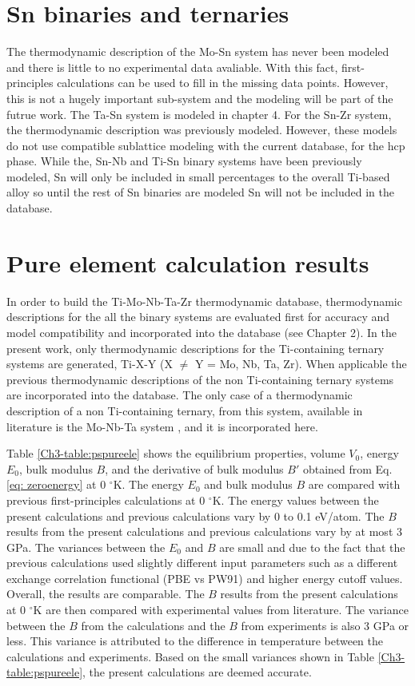 \section{Sn binaries and ternaries}

The thermodynamic description of the Mo-Sn system has never been modeled and there is little to no experimental data avaliable. With this fact, first-principles calculations can be used to fill in the missing data points. However, this is not a hugely important sub-system and the modeling will be part of the futrue work. The Ta-Sn system is modeled in chapter 4. For the Sn-Zr system, the thermodynamic description was previously modeled. However, these models do not use compatible sublattice modeling with the current database, for the hcp phase. While the, Sn-Nb and Ti-Sn binary systems have been previously modeled, Sn will only be included in small percentages to the overall Ti-based alloy so until the rest of Sn binaries are modeled Sn will not be included in the database.

\section{Pure element calculation results}

In order to build the Ti-Mo-Nb-Ta-Zr thermodynamic database, thermodynamic descriptions for the all the binary systems are evaluated first for accuracy and model compatibility and incorporated into the database (see Chapter 2). In the present work, only thermodynamic descriptions for the Ti-containing ternary systems are generated, Ti-X-Y (X $\neq$ Y = Mo, Nb, Ta, Zr). When applicable the previous thermodynamic descriptions of the non Ti-containing ternary systems are incorporated into the database. The only case of a thermodynamic description of a non Ti-containing ternary, from this system, available in literature is the Mo-Nb-Ta system \cite{Xiong2004}, and it is incorporated here.

Table \ref{Ch3-table:pspureele} shows the equilibrium properties, volume $V_{0}$, energy $E_{0}$, bulk modulus $B$, and the derivative of bulk modulus $B'$ obtained from Eq. \ref{eq: zeroenergy} at 0 $^{\circ}$K. The energy $E_{0}$ and bulk modulus $B$ are compared with previous first-principles calculations at 0 $^{\circ}$K. The energy values between the present calculations and previous calculations vary by 0 to 0.1 eV/atom. The $B$ results from the present calculations and previous calculations vary by at most 3 GPa. The variances between the $E_{0}$ and $B$ are small and due to the fact that the previous calculations used slightly different input parameters such as a different exchange correlation functional (PBE vs PW91) and higher energy cutoff values. Overall, the results are comparable. The $B$ results from the present calculations at 0 $^{\circ}$K are then compared with experimental values from literature. The variance between the $B$ from the calculations and the $B$ from experiments is also 3 GPa or less. This variance is attributed to the difference in temperature between the calculations and experiments. Based on the small variances shown in Table \ref{Ch3-table:pspureele}, the present calculations are deemed accurate. 


